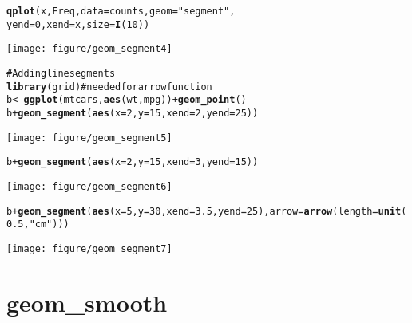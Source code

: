 \documentclass[a4paper,titlepage]{tufte-handout}\usepackage{graphicx, color}
\makeatletter
\def\maxwidth{ %
  \ifdim\Gin@nat@width>\linewidth
    \linewidth
  \else
    \Gin@nat@width
  \fi
}
\newcommand{\hlfunctioncall}[1]{\textcolor[rgb]{0.501960784313725,0,0.329411764705882}{\textbf{#1}}}%
\newcommand{\hlstring}[1]{\textcolor[rgb]{0.6,0.6,1}{#1}}%
\newcommand{\hlcomment}[1]{\textcolor[rgb]{0.180392156862745,0.6,0.341176470588235}{#1}}%
\newenvironment{kframe}{%
 \def\at@end@of@kframe{}%
 \ifinner\ifhmode%
  \def\at@end@of@kframe{\end{minipage}}%
  \begin{minipage}{\columnwidth}%
 \fi\fi%
 \def\FrameCommand##1{\hskip\@totalleftmargin \hskip-\fboxsep
 \colorbox{shadecolor}{##1}\hskip-\fboxsep
     \hskip-\linewidth \hskip-\@totalleftmargin \hskip\columnwidth}%
 \MakeFramed {\advance\hsize-\width
   \@totalleftmargin\z@ \linewidth\hsize
   \@setminipage}}%
 {\par\unskip\endMakeFramed%
 \at@end@of@kframe}
\newenvironment{knitrout}{}{} %
\makeatother
\begin{document}
\begin{knitrout}
\begin{kframe}
\begin{alltt}
\hlfunctioncall{qplot}(x, Freq, data = counts, geom = \hlstring{"segment"},
  yend = 0, xend = x, size = \hlfunctioncall{I}(10))
\end{alltt}
\end{kframe}\texttt{[image: figure/geom\_segment4]} \begin{kframe}\begin{alltt}
\hlcomment{# Adding line segments}
\hlfunctioncall{library}(grid) \hlcomment{# needed for arrow function}
b <- \hlfunctioncall{ggplot}(mtcars, \hlfunctioncall{aes}(wt, mpg)) + \hlfunctioncall{geom_point}()
b + \hlfunctioncall{geom_segment}(\hlfunctioncall{aes}(x = 2, y = 15, xend = 2, yend = 25))
\end{alltt}
\end{kframe}\texttt{[image: figure/geom\_segment5]} \begin{kframe}\begin{alltt}
b + \hlfunctioncall{geom_segment}(\hlfunctioncall{aes}(x = 2, y = 15, xend = 3, yend = 15))
\end{alltt}
\end{kframe}\texttt{[image: figure/geom\_segment6]} \begin{kframe}\begin{alltt}
b + \hlfunctioncall{geom_segment}(\hlfunctioncall{aes}(x = 5, y = 30, xend = 3.5, yend = 25), arrow = \hlfunctioncall{arrow}(length = \hlfunctioncall{unit}(0.5, \hlstring{"cm"})))
\end{alltt}
\end{kframe}\texttt{[image: figure/geom\_segment7]} 
\end{knitrout}


\section{geom\_smooth}
\end{document}
